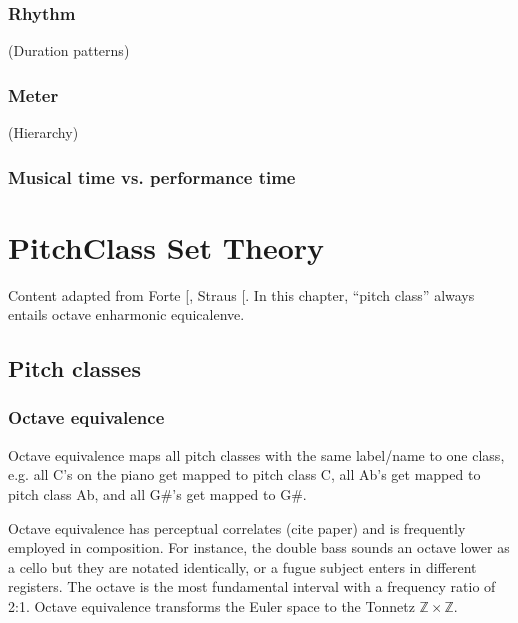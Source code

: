 \documentclass[letterpaper,10pt,english]{sphinxmanual}
\begin{document}
\subsection{Rhythm}
\label{\detokenize{1_fundamentals:rhythm}}
(Duration patterns)


\subsection{Meter}
\label{\detokenize{1_fundamentals:meter}}
(Hierarchy)


\subsection{Musical time vs. performance time}
\label{\detokenize{1_fundamentals:musical-time-vs-performance-time}}

\chapter{Pitch\sphinxhyphen{}Class Set Theory}
\label{\detokenize{3_set_theory:pitch-class-set-theory}}\label{\detokenize{3_set_theory::doc}}
Content adapted from Forte {[}\sphinxcite{8_bibliography:id7}{]}, Straus {[}\sphinxcite{8_bibliography:id3}{]}.
In this chapter, “pitch class” always entails octave  enharmonic equicalenve.


\section{Pitch classes}
\label{\detokenize{3_set_theory:pitch-classes}}

\subsection{Octave equivalence}
\label{\detokenize{3_set_theory:octave-equivalence}}
Octave equivalence maps all pitch classes with the same label/name to one class,
e.g. all C’s on the piano get mapped to pitch class C, all Ab’s get mapped to pitch class Ab,
and all G\#’s get mapped to G\#.

Octave equivalence has perceptual correlates (cite paper) and is frequently employed in composition.
For instance, the double bass sounds an octave lower as a cello but they are notated identically,
or a fugue subject enters in different registers.
The octave is the most fundamental interval with a frequency ratio of 2:1.
Octave equivalence transforms the Euler space to the Tonnetz \(\mathbb{Z}\times\mathbb{Z}\).
\end{document}

